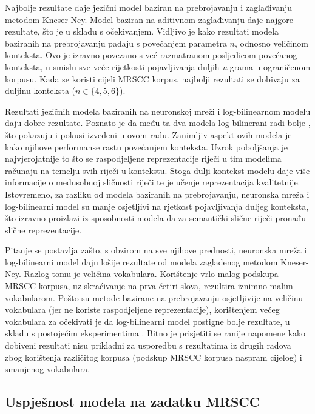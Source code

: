\documentclass[times, utf8, diplomski, numeric]{fer}
\begin{document}
Najbolje rezultate daje jezični model baziran na prebrojavanju i zaglađivanju metodom Kneser-Ney. Model baziran na aditivnom zaglađivanju daje najgore rezultate, što je u skladu s očekivanjem. Vidljivo je kako rezultati modela baziranih na prebrojavanju padaju s povećanjem parametra $n$, odnosno veličinom konteksta. Ovo je izravno povezano s već razmatranom posljedicom povećanog konteksta, u smislu sve veće rijetkosti pojavljivanja duljih \textit{n}-grama u ograničenom korpusu. Kada se koristi cijeli MRSCC korpus, najbolji rezultati se dobivaju za duljinu konteksta ($n \in \{4, 5, 6\}$).

Rezultati jezičnih modela baziranih na neuronskoj mreži i log-bilinearnom modelu daju dobre rezultate. Poznato je da među ta dva modela log-bilinerani radi bolje \cite{MnihH07}, što pokazuju i pokusi izvedeni u ovom radu. Zanimljiv aspekt ovih modela je kako njihove performanse rastu povećanjem konteksta. Uzrok poboljšanja je najvjerojatnije to što se raspodjeljene reprezentacije riječi u tim modelima računaju na temelju svih riječi u kontekstu. Stoga dulji kontekst modelu daje više informacije o međusobnoj sličnosti riječi te je učenje reprezentacija kvalitetnije. Istovremeno, za razliku od modela baziranih na prebrojavanju, neuronska mreža i log-bilinearni model su manje osjetljivi na rjetkost pojavljivanja duljeg konteksta, što izravno proizlazi iz sposobnosti modela da za semantički slične riječi pronađu slične reprezentacije.

Pitanje se postavlja zašto, s obzirom na sve njihove prednosti, neuronska mreža i log-bilinearni model daju lošije rezultate od modela zaglađenog metodom Kneser-Ney. Razlog tomu je veličina vokabulara. Korištenje vrlo malog podskupa MRSCC korpusa, uz skraćivanje na prva četiri slova, rezultira iznimno malim vokabularom. Pošto su metode bazirane na prebrojavanju osjetljivije na veličinu vokabulara (jer ne koriste raspodjeljene reprezentacije), korištenjem većeg vokabulara za očekivati je da log-bilinearni model postigne bolje rezultate, u skladu s postojećim eksperimentima \cite{MnihH07}. Bitno je prisjetiti se ranije napomene kako dobiveni rezultati nisu prikladni za usporedbu s rezultatima iz drugih radova zbog korištenja različitog korpusa (podskup MRSCC korpusa naspram cijelog) i smanjenog vokabulara.

\subsection{Uspješnost modela na zadatku MRSCC}
\end{document}
